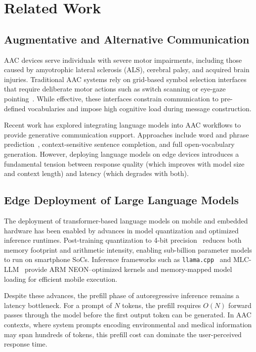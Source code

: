 \section{Related Work}
\label{sec:related}

\subsection{Augmentative and Alternative Communication}
\label{sec:related_aac}

AAC devices serve individuals with severe motor impairments, including those caused by amyotrophic lateral sclerosis (ALS), cerebral palsy, and acquired brain injuries. Traditional AAC systems rely on grid-based symbol selection interfaces that require deliberate motor actions such as switch scanning or eye-gaze pointing~\cite{beukelman2020}. While effective, these interfaces constrain communication to pre-defined vocabularies and impose high cognitive load during message construction.

Recent work has explored integrating language models into AAC workflows to provide generative communication support. Approaches include word and phrase prediction~\cite{vertanen2015}, context-sensitive sentence completion, and full open-vocabulary generation. However, deploying language models on edge devices introduces a fundamental tension between response quality (which improves with model size and context length) and latency (which degrades with both).

\subsection{Edge Deployment of Large Language Models}
\label{sec:related_edge}

The deployment of transformer-based language models on mobile and embedded hardware has been enabled by advances in model quantization and optimized inference runtimes. Post-training quantization to 4-bit precision~\cite{dettmers2022,frantar2022} reduces both memory footprint and arithmetic intensity, enabling sub-billion parameter models to run on smartphone SoCs. Inference frameworks such as \texttt{llama.cpp}~\cite{llamacpp} and MLC-LLM~\cite{mlcllm} provide ARM NEON--optimized kernels and memory-mapped model loading for efficient mobile execution.

Despite these advances, the prefill phase of autoregressive inference remains a latency bottleneck. For a prompt of $N$ tokens, the prefill requires $O(N)$ forward passes through the model before the first output token can be generated. In AAC contexts, where system prompts encoding environmental and medical information may span hundreds of tokens, this prefill cost can dominate the user-perceived response time.

